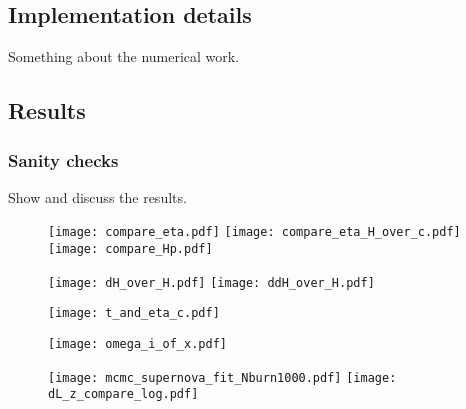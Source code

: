 \subsection{Implementation details}\label{M1:implementation} 
Something about the numerical work.

\subsection{Results}\label{M1:results}
\subsubsection{Sanity checks}
Show and discuss the results.



\begin{figure}
    \texttt{[image: compare\_eta.pdf]}
    \texttt{[image: compare\_eta\_H\_over\_c.pdf]}
    \texttt{[image: compare\_Hp.pdf]}
\end{figure}

\begin{figure}[ht!]
    \texttt{[image: dH\_over\_H.pdf]}
    \texttt{[image: ddH\_over\_H.pdf]}
\end{figure}

\begin{figure}[ht!]
    \texttt{[image: t\_and\_eta\_c.pdf]}
\end{figure}


\begin{figure}[ht!]
    \texttt{[image: omega\_i\_of\_x.pdf]}
\end{figure}

\begin{figure}[ht!]
    \texttt{[image: mcmc\_supernova\_fit\_Nburn1000.pdf]}
    \texttt{[image: dL\_z\_compare\_log.pdf]}
\end{figure}